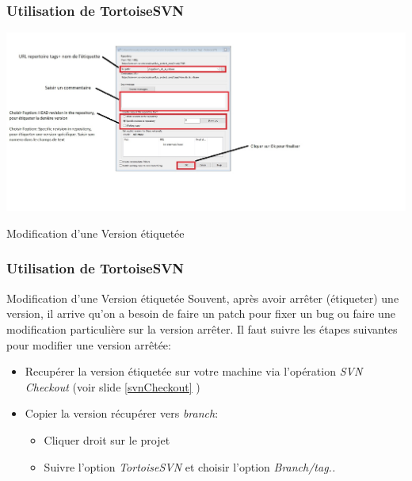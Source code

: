 \documentclass{beamer}
\begin{document}
\begin{frame}
\frametitle{Utilisation de TortoiseSVN}
\includegraphics[scale=.5]{../images/etiquetage2.jpg}
\end{frame}


\begin{frame}
\begin{center}
\huge{Modification d'une Version étiquetée}
\end{center}
\end{frame}

\begin{frame}
\frametitle{Utilisation de TortoiseSVN}

\begin{block}{Modification d'une Version étiquetée}
Souvent, après avoir arrêter (étiqueter) une version, il arrive qu'on a  besoin de faire un patch pour fixer un bug ou faire une modification particulière sur la version arrêter.  Il faut suivre les étapes suivantes pour modifier une version arrêtée:
\begin{itemize}
\item Recupérer la version étiquetée sur votre machine via l'opération \alert{\textit{SVN Checkout}} (voir slide \ref{svnCheckout} )
\item Copier la version récupérer vers \alert{\textit{branch}}:
\begin{itemize}
\item Cliquer droit sur le projet
\item Suivre l'option \alert{\textit{TortoiseSVN}} et choisir l'option \alert{\textit{Branch/tag..}}
\end{itemize}
\end{itemize}
\end{block}
\end{frame}
\end{document}
